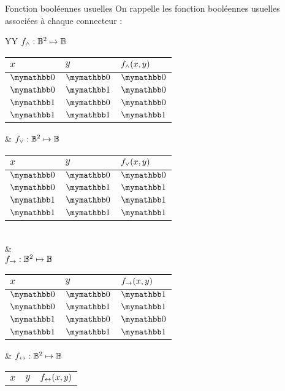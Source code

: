 \documentclass[10pt]{beamer}
\begin{document}
\begin{frame}{\Ctitle}{\stitle}
	\begin{block}{Fonction booléennes usuelles}
		On rappelle les fonction booléennes usuelles associées à chaque connecteur :
		\begin{tabularx}{\textwidth}{YY}
			$f_{\wedge} : \mathbb{B}^2 \mapsto \mathbb{B}$ \newline
			\begin{tabular}{l|l|l}
				$x$ & $y$ & $f_{\wedge}(x,y)$ \\
				\hline
				 $\faux$ &  $\faux$ &  $\faux$            \\
				 $\faux$ &  $\vrai$ &  $\faux$            \\
				 $\vrai$ &  $\faux$ &  $\faux$            \\
				 $\vrai$ &  $\vrai$ &  $\vrai$            \\
			\end{tabular} &
			$f_{\vee} : \mathbb{B}^2 \mapsto \mathbb{B}$ \newline
			\begin{tabular}{l|l|l}
				$x$ & $y$ & $f_{\vee}(x,y)$ \\
				\hline
				 $\faux$ &  $\faux$ &  $\faux$            \\
				 $\faux$ &  $\vrai$ &  $\vrai$            \\
				 $\vrai$ &  $\faux$ &  $\vrai$            \\
				 $\vrai$ &  $\vrai$ &  $\vrai$            \\
			\end{tabular}      \\
			                                                    & \\
			$f_{\to} : \mathbb{B}^2 \mapsto \mathbb{B}$ \newline
			\begin{tabular}{l|l|l}
				$x$ & $y$ & $f_{\to}(x,y)$ \\
				\hline
				 $\faux$ &  $\faux$ &  $\vrai$             \\
				 $\faux$ &  $\vrai$ &  $\vrai$             \\
				 $\vrai$ &  $\faux$ &  $\faux$             \\
				 $\vrai$ &  $\vrai$ &  $\vrai$             \\
			\end{tabular} &
			$f_{\leftrightarrow} : \mathbb{B}^2 \mapsto \mathbb{B}$ \newline
			\begin{tabular}{l|l|l}
				$x$ & $y$ & $f_{\leftrightarrow}(x,y)$ \\

\end{tabular}
\end{tabularx}
\end{block}
\end{frame}
\end{document}
